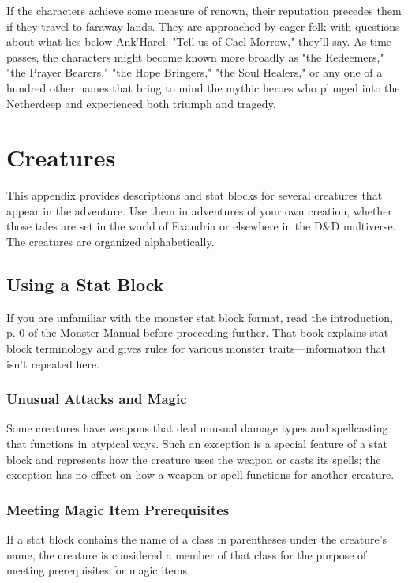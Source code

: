 \documentclass[a4paper, 11pt, bg=full, twocolumn, nooutline]{dndbook}
\begin{document}
If the characters achieve some measure of renown, their reputation precedes them if they travel to faraway lands. They are approached by eager folk with questions about what lies below Ank'Harel. "Tell us of Cael Morrow," they'll say. As time passes, the characters might become known more broadly as "the Redeemers," "the Prayer Bearers," "the Hope Bringers," "the Soul Healers," or any one of a hundred other names that bring to mind the mythic heroes who plunged into the Netherdeep and experienced both triumph and tragedy.

\chapter{Creatures}\label{ch:creatures-9-9}

This appendix provides descriptions and stat blocks for several creatures that appear in the adventure. Use them in adventures of your own creation, whether those tales are set in the world of Exandria or elsewhere in the D\&D multiverse.
The creatures are organized alphabetically.
\section{Using a Stat Block}

If you are unfamiliar with the monster stat block format, read the introduction, p. 0 of the Monster Manual before proceeding further. That book explains stat block terminology and gives rules for various monster traits---information that isn't repeated here.

\subsection{Unusual Attacks and Magic}

Some creatures have weapons that deal unusual damage types and spellcasting that functions in atypical ways. Such an exception is a special feature of a stat block and represents how the creature uses the weapon or casts its spells; the exception has no effect on how a weapon or spell functions for another creature.

\subsection{Meeting Magic Item Prerequisites}

If a stat block contains the name of a class in parentheses under the creature's name, the creature is considered a member of that class for the purpose of meeting prerequisites for magic items.
\end{document}
